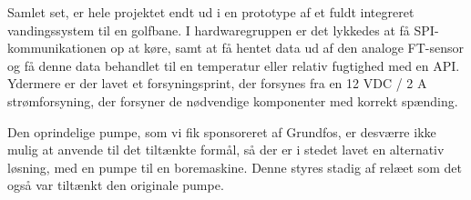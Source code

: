 
Samlet set, er hele projektet endt ud i en prototype af et fuldt integreret vandingssystem til en golfbane. 
I hardwaregruppen er det lykkedes at få SPI-kommunikationen op at køre, samt at få hentet data ud af den analoge FT-sensor og få denne data behandlet til en temperatur eller relativ fugtighed med en API.
Ydermere er der lavet et forsyningsprint, der forsynes fra en 12 VDC / 2 A strømforsyning, der forsyner de nødvendige komponenter med korrekt spænding.

Den oprindelige pumpe, som vi fik sponsoreret af Grundfos, er desværre ikke mulig at anvende til det tiltænkte formål, så der er i stedet lavet en alternativ løsning, med en pumpe til en boremaskine. Denne styres stadig af relæet som det også var tiltænkt den originale pumpe. 

